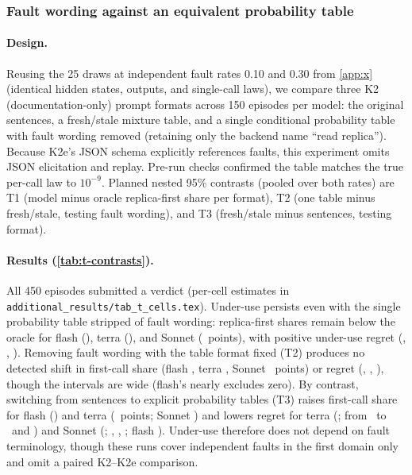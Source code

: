 \subsubsection{Fault wording against an equivalent probability table}\label{app:t}
\paragraph{Design.}
Reusing the 25 draws at independent fault rates 0.10 and 0.30 from \cref{app:x} (identical hidden states, outputs, and single-call laws), we compare three K2 (documentation-only) prompt formats across 150 episodes per model: the original sentences, a fresh/stale mixture table, and a single conditional probability table with fault wording removed (retaining only the backend name ``read replica''). Because K2e's JSON schema explicitly references faults, this experiment omits JSON elicitation and replay. Pre-run checks confirmed the table matches the true per-call law to $10^{-9}$. Planned nested 95\% contrasts (pooled over both rates) are T1 (model minus oracle replica-first share per format), T2 (one table minus fresh/stale, testing fault wording), and T3 (fresh/stale minus sentences, testing format).

\paragraph{Results (\cref{tab:t-contrasts}).}
All 450 episodes submitted a verdict (per-cell estimates in \texttt{additional\_results/tab\_t\_cells.tex}). Under-use persists even with the single probability table stripped of fault wording: replica-first shares remain below the oracle for flash (\twFlashTTGap), terra (\twTerraTTGap), and Sonnet (\twSonnetTTGap\ points), with positive under-use regret (\twFlashTTUnder, \twTerraTTUnder, \twSonnetTTUnder). Removing fault wording with the table format fixed (T2) produces no detected shift in first-call share (flash \twFlashTTmTDFirst, terra \twTerraTTmTDFirst, Sonnet \twSonnetTTmTDFirst\ points) or regret (\twFlashTTmTDRegret, \twTerraTTmTDRegret, \twSonnetTTmTDRegret), though the intervals are wide (flash's nearly excludes zero). By contrast, switching from sentences to explicit probability tables (T3) raises first-call share for flash (\twFlashTDmTSFirst) and terra (\twTerraTDmTSFirst\ points; Sonnet \twSonnetTDmTSFirst) and lowers regret for terra (\twTerraTDmTSRegret; from \twTerraTSRegret\ to \twTerraTDRegret\ and \twTerraTTRegret) and Sonnet (\twSonnetTDmTSRegret; \twSonnetTSRegret, \twSonnetTDRegret, \twSonnetTTRegret; flash \twFlashTDmTSRegret). Under-use therefore does not depend on fault terminology, though these runs cover independent faults in the first domain only and omit a paired K2--K2e comparison.


